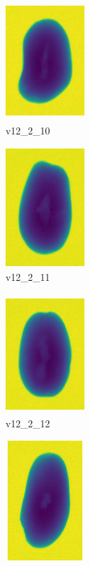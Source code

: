 \documentclass[11pt]{article}
\begin{document}
\begin{figure}
          \begin{subfigure}[b]{0.15\textwidth}
         \centering
         \includegraphics[width=3cm, height=4.5cm]{images/kartofler/v12_2_10_cut.png}
         \caption{v12\_2\_10}
         \label{fig:y equals x}
     \end{subfigure}
     \hfill
     \begin{subfigure}[b]{0.15\textwidth}
         \centering
         \includegraphics[width=3cm, height=4.5cm]{images/kartofler/v12_2_11_cut.png}
        \caption{v12\_2\_11}
         \label{fig:three sin x}
     \end{subfigure}
     \hfill
     \begin{subfigure}[b]{0.15\textwidth}
         \centering
         \includegraphics[width=3cm, height=4.5cm]{images/kartofler/v12_2_12_cut.png}
        \caption{v12\_2\_12}
         \label{fig:five over x}
     \end{subfigure}
     \hfill
    \begin{subfigure}[b]{0.15\textwidth}
         \centering
         \includegraphics[width=3cm, height=4.5cm]{images/kartofler/v12_2_13_cut.png}

\end{subfigure}
\end{figure}
\end{document}
